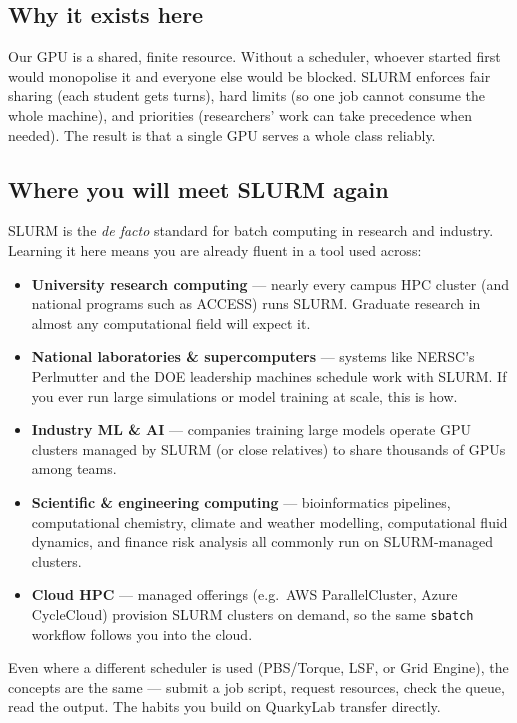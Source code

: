 \documentclass[11pt]{article}
\newcommand{\LabName}{QuarkyLab}                       %
\newcommand{\code}[1]{\texttt{#1}}
\begin{document}
\subsection*{Why it exists here}
Our GPU is a shared, finite resource. Without a scheduler, whoever started first would monopolise it and everyone else would be blocked. SLURM enforces fair sharing (each student gets turns), hard limits (so one job cannot consume the whole machine), and priorities (researchers' work can take precedence when needed). The result is that a single GPU serves a whole class reliably.

\subsection*{Where you will meet SLURM again}
SLURM is the \emph{de facto} standard for batch computing in research and industry. Learning it here means you are already fluent in a tool used across:
\begin{itemize}[itemsep=2pt]
  \item \textbf{University research computing} --- nearly every campus HPC cluster (and national programs such as ACCESS) runs SLURM. Graduate research in almost any computational field will expect it.
  \item \textbf{National laboratories \& supercomputers} --- systems like NERSC's Perlmutter and the DOE leadership machines schedule work with SLURM. If you ever run large simulations or model training at scale, this is how.
  \item \textbf{Industry ML \& AI} --- companies training large models operate GPU clusters managed by SLURM (or close relatives) to share thousands of GPUs among teams.
  \item \textbf{Scientific \& engineering computing} --- bioinformatics pipelines, computational chemistry, climate and weather modelling, computational fluid dynamics, and finance risk analysis all commonly run on SLURM-managed clusters.
  \item \textbf{Cloud HPC} --- managed offerings (e.g.\ AWS ParallelCluster, Azure CycleCloud) provision SLURM clusters on demand, so the same \code{sbatch} workflow follows you into the cloud.
\end{itemize}
Even where a different scheduler is used (PBS/Torque, LSF, or Grid Engine), the concepts are the same --- submit a job script, request resources, check the queue, read the output. The habits you build on \LabName{} transfer directly.
\end{document}
